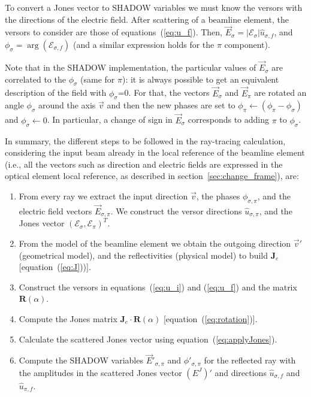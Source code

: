 \documentclass{iucr}
\begin{document}
To convert a Jones vector to SHADOW variables we must know the versors with the directions of the electric field.
After scattering of a beamline element, the versors to consider are those of equations~(\ref{eq:u_f}).
Then, $\vec{E}_\sigma=|\mathcal{E}_\sigma| \hat{u}_{\sigma,f}$, and 
$\phi_\sigma=\arg(\mathcal{E}_{\sigma,f})$
(and a similar expression holds for the $\pi$ component).

Note that in the SHADOW implementation, the particular values of $\vec{E}_\sigma$ are correlated to the $\phi_\sigma$ (same for $\pi$): it is always possible to get an equivalent description of the field with $\phi_\sigma$=0. For that, the vectors $\vec{E}_\sigma$ and $\vec{E}_\pi$ are rotated an angle $\phi_\sigma$ around the axis $\vec{v}$ and then the new phases are set to $\phi_\pi \xleftarrow{}(\phi_\pi-\phi_\sigma)$ and $\phi_\sigma\xleftarrow{}0$. In particular, a change of sign in $\vec{E}_\sigma$ corresponds to adding $\pi$ to $\phi_\sigma$.



In summary, the different steps to be followed in the ray-tracing calculation, considering the input beam already in the local reference of the beamline element (i.e., all the vectors such as direction and electric fields are expressed in the optical element local reference, as described in section~\ref{sec:change_frame}), are:

\begin{enumerate}

\item From every ray we extract the input direction $\vec{v}$, the phases $\phi_{\sigma,\pi}$, and the electric field vectors $\vec{E}_{\sigma,\pi}$. We construct the versor directions $\hat{u}_{\sigma,\pi}$, and the Jones vector $(\mathcal{E}_\sigma, \mathcal{E}_\pi)^T$.

\item From the model of the beamline element we obtain the outgoing direction $\vec{v}'$ (geometrical model), and the reflectivities (physical model) to build $\mathbf{J}_e$ [equation~(\ref{eq:J}))].

\item Construct the versors in equations~(\ref{eq:u_i}) and (\ref{eq:u_f}) and the matrix $\textbf{R}(\alpha)$.


\item Compute the Jones matrix $\textbf{J}_e \cdot \textbf{R}(\alpha)$ [equation~(\ref{eq:rotation})].

\item Calculate the scattered Jones vector using equation~(\ref{eq:applyJones}).

\item Compute the SHADOW variables $\vec{E}'_{\sigma,\pi}$ and $\phi'_{\sigma,\pi}$ for the reflected ray with the amplitudes in the scattered Jones vector $(E^J)'$ and directions $\hat{u}_{\sigma,f}$ and $\hat{u}_{\pi,f}$.
\end{enumerate}
\end{document}
